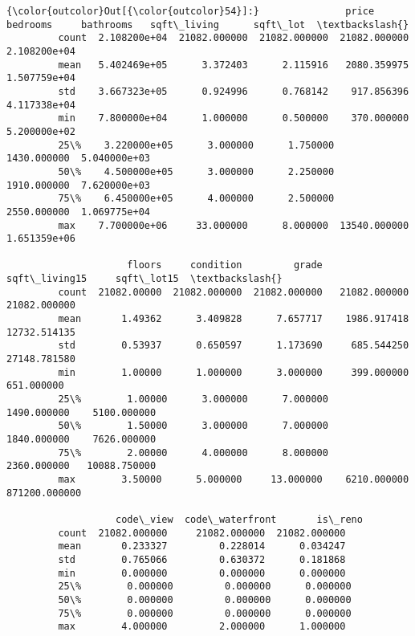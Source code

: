 \documentclass[11pt]{article}
\begin{document}
\begin{Verbatim}[commandchars=\\\{\}]
{\color{outcolor}Out[{\color{outcolor}54}]:}               price      bedrooms     bathrooms   sqft\_living      sqft\_lot  \textbackslash{}
         count  2.108200e+04  21082.000000  21082.000000  21082.000000  2.108200e+04   
         mean   5.402469e+05      3.372403      2.115916   2080.359975  1.507759e+04   
         std    3.667323e+05      0.924996      0.768142    917.856396  4.117338e+04   
         min    7.800000e+04      1.000000      0.500000    370.000000  5.200000e+02   
         25\%    3.220000e+05      3.000000      1.750000   1430.000000  5.040000e+03   
         50\%    4.500000e+05      3.000000      2.250000   1910.000000  7.620000e+03   
         75\%    6.450000e+05      4.000000      2.500000   2550.000000  1.069775e+04   
         max    7.700000e+06     33.000000      8.000000  13540.000000  1.651359e+06   
         
                     floors     condition         grade  sqft\_living15     sqft\_lot15  \textbackslash{}
         count  21082.00000  21082.000000  21082.000000   21082.000000   21082.000000   
         mean       1.49362      3.409828      7.657717    1986.917418   12732.514135   
         std        0.53937      0.650597      1.173690     685.544250   27148.781580   
         min        1.00000      1.000000      3.000000     399.000000     651.000000   
         25\%        1.00000      3.000000      7.000000    1490.000000    5100.000000   
         50\%        1.50000      3.000000      7.000000    1840.000000    7626.000000   
         75\%        2.00000      4.000000      8.000000    2360.000000   10088.750000   
         max        3.50000      5.000000     13.000000    6210.000000  871200.000000   
         
                   code\_view  code\_waterfront       is\_reno  
         count  21082.000000     21082.000000  21082.000000  
         mean       0.233327         0.228014      0.034247  
         std        0.765066         0.630372      0.181868  
         min        0.000000         0.000000      0.000000  
         25\%        0.000000         0.000000      0.000000  
         50\%        0.000000         0.000000      0.000000  
         75\%        0.000000         0.000000      0.000000  
         max        4.000000         2.000000      1.000000  
\end{Verbatim}
            
\end{document}

